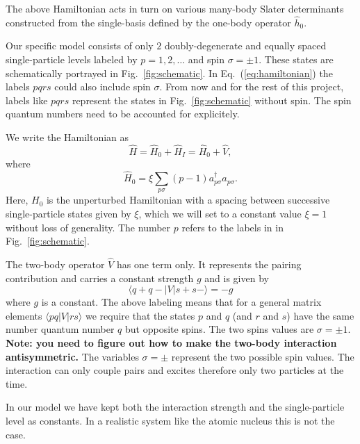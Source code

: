 \documentclass[prc]{revtex4}
\begin{document}
The above Hamiltonian 
acts in turn on various many-body Slater determinants constructed from the single-basis defined by the one-body
operator $\hat{h}_0$.    

Our specific model consists of only $2$ doubly-degenerate and equally spaced
single-particle levels labeled by $p=1,2,\dots$ and spin $\sigma=\pm
1$.  These states are schematically portrayed in
Fig.~\ref{fig:schematic}.  In Eq.~(\ref{eq:hamiltonian}) the labels $pqrs$ could also include spin $\sigma$. From now and for the rest of this project, labels like $pqrs$ represent the states in Fig.~\ref{fig:schematic} without spin. The spin quantum numbers need to be accounted for explicitely.

We write
the Hamiltonian as 
\[ \hat{H} = \hat{H}_0 +\hat{H}_I=\hat{H}_0 + \hat{V} , \]
where
\[
\hat{H}_0=\xi\sum_{p\sigma}(p-1)a_{p\sigma}^{\dagger}a_{p\sigma}.
\]
Here, $H_0$ is the unperturbed Hamiltonian with a spacing between
successive single-particle states given by $\xi$, which we will set to
a constant value $\xi=1$ without loss of generality. The number $p$ refers to the labels in
in Fig.~\ref{fig:schematic}.

The two-body
operator $\hat{V}$ has one term only. It represents the
pairing contribution and carries a constant strength $g$
and is  given by 
\[
\langle q+q-| V|s+s-\rangle  = -g  
\]
where $g$ is a constant. The above labeling means that for a  general matrix elements
$\langle pq| V|rs\rangle$ we require that the states $p$ and $q$ (and $r$ and $s$) have the same number 
quantum number $q$ but opposite spins. The two spins values are
$\sigma = \pm 1$.  
{\bf Note: you need to figure out how to make the two-body interaction antisymmetric.}
The variables $\sigma=\pm$ represent the two possible spin values. The 
interaction can only couple pairs and excites therefore only two
particles at the time.


In our model we have kept both the interaction strength and the single-particle level as constants.
In a realistic system like the atomic  nucleus this is not the case. 
\end{document}
